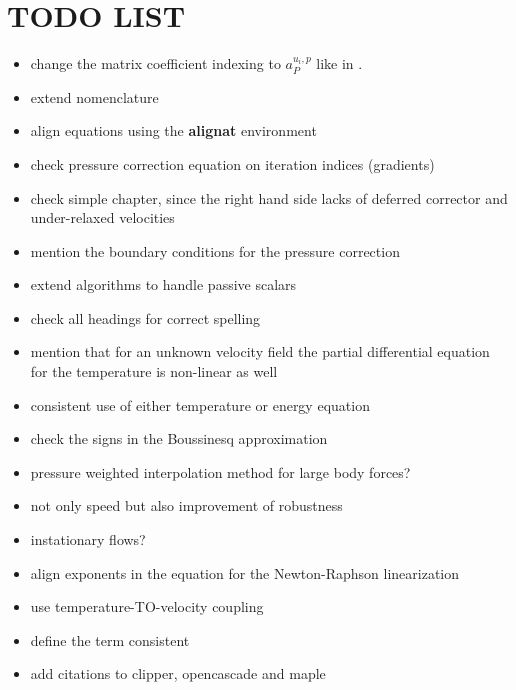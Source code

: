 \documentclass[article,type=msc,colorback,accentcolor=tud2a]{tudthesis}
\begin{document}
  \author{Fabian Gabel}
  \makethesistitle
    
  \tableofcontents
  \listoffigures
  \listoftables
  \listofalgorithms



  \section*{TODO LIST}

  \begin{itemize}
    \item change the matrix coefficient indexing to \(a_P^{u_i,p}\) like in \cite{darwish09}.
    \item extend nomenclature
    \item align equations using the \textbf{alignat} environment
    \item check pressure correction equation on iteration indices (gradients)
    \item check simple chapter, since the right hand side lacks of deferred corrector and under-relaxed velocities
    \item mention the boundary conditions for the pressure correction
    \item extend algorithms to handle passive scalars
    \item check all headings for correct spelling
    \item mention that for an unknown velocity field the partial differential equation for the temperature is non-linear as well
    \item consistent use of either temperature or energy equation
    \item check the signs in the Boussinesq approximation
    \item pressure weighted interpolation method for large body forces?
    \item not only speed but also improvement of robustness
    \item instationary flows?
    \item align exponents in the equation for the Newton-Raphson linearization
    \item use temperature-TO-velocity coupling
    \item define the term consistent
    \item add citations to clipper, opencascade and maple
  \end{itemize}
\end{document}
